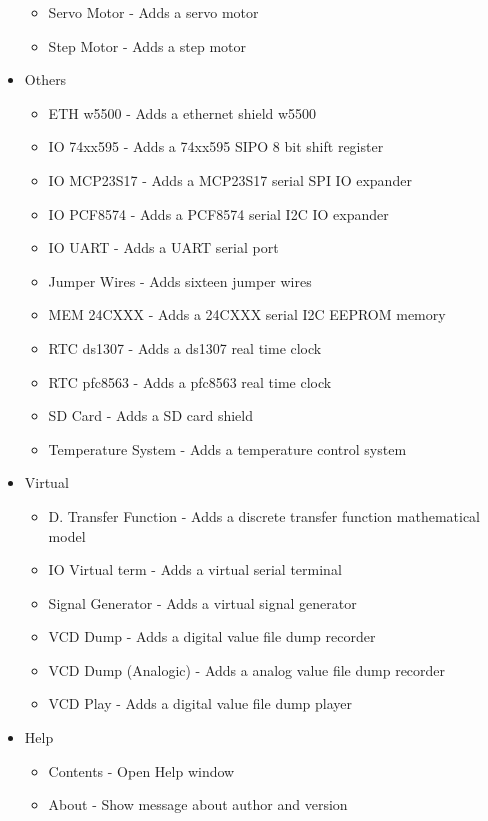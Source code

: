 \begin{itemize}
\begin{itemize}
   \item Servo Motor - Adds a servo motor
   \item Step Motor - Adds a step motor
 \end{itemize}
 \item{Others}
  \begin{itemize}
   \item ETH w5500 - Adds a ethernet shield w5500
   \item IO 74xx595 - Adds a 74xx595 SIPO 8 bit shift register
   \item IO MCP23S17 - Adds a MCP23S17 serial SPI IO expander
   \item IO PCF8574 - Adds a PCF8574 serial I2C IO expander
   \item IO UART - Adds a UART serial port 
   \item Jumper Wires - Adds sixteen jumper wires 
   \item MEM 24CXXX - Adds a 24CXXX serial I2C EEPROM  memory
   \item RTC ds1307 - Adds a ds1307 real time clock 
   \item RTC pfc8563 - Adds a pfc8563 real time clock
   \item SD Card - Adds a SD card shield
   \item Temperature System - Adds a temperature control system
  \end{itemize}
\item{Virtual}
  \begin{itemize}
  \item D. Transfer Function - Adds a discrete transfer function mathematical model
  \item IO Virtual term - Adds a virtual serial terminal 
  \item Signal Generator - Adds a virtual signal generator
  \item VCD Dump - Adds a digital value file dump recorder 
  \item VCD Dump (Analogic) - Adds a analog value file dump recorder  
  \item VCD Play - Adds a digital value file dump player  
  \end{itemize}   
 \item Help
 \begin{itemize}
 \item Contents - Open Help window
 \item About - Show message about author and version
\end{itemize}
\end{itemize}


